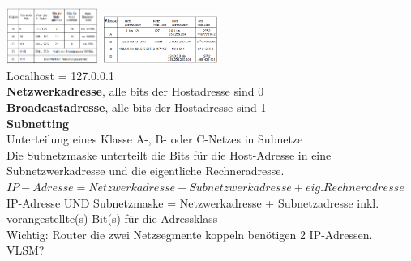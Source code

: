 \documentclass[fs, footer]{latex4ei}
\begin{document}
\begin{multicols*}{4}
{	\includegraphics[width = 3cm]{./img/IP_Adressklassen.png} 
	\includegraphics[width = 3.8cm]{./img/IP_Adressraum.png}\\

	Localhost = 127.0.0.1 \\
	\textbf{Netzwerkadresse}, alle bits der Hostadresse sind 0 \\
	\textbf{Broadcastadresse}, alle bits der Hostadresse sind 1  \\
	

	\textbf{Subnetting} \\
	Unterteilung eines Klasse A-, B- oder C-Netzes in Subnetze \\
	Die Subnetzmaske unterteilt die Bits für die Host-Adresse in eine Subnetzwerkadresse und die eigentliche Rechneradresse. \\
	$IP-Adresse = Netzwerkadresse + Subnetzwerkadresse + eig. Rechneradresse$ \\
	IP-Adresse UND Subnetzmaske = Netzwerkadresse + Subnetzadresse inkl. vorangestellte(s) Bit(s) für die Adressklass \\
	
	
	Wichtig: Router die zwei Netzsegmente koppeln benötigen 2 IP-Adressen.\\
	
	VLSM?
}



\sectionbox{
	\subsection{}

}





\columnbreak



\end{multicols*}
\end{document}
